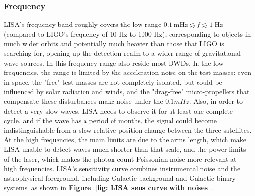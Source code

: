 \subsubsection{Frequency}
LISA's frequency band roughly covers the low range $0.1~\mathrm{mHz} \lesssim f \lesssim 1~\mathrm{Hz}$ (compared to LIGO's frequency of 10 Hz to 1000 Hz), corresponding to objects in much wider orbits and potentially much heavier than those that LIGO is searching for, opening up the detection realm to a wider range of gravitational wave sources. 
In this frequency range also reside most DWDs.  
In the low frequencies, the range is limited by the acceleration noise on the test masses: even in space, the "free" test masses are not completely isolated, but could be influenced by solar radiation and winds, and the "drag-free" micro-propellers that compensate these disturbances make noise under the $0.1mHz$. 
Also, in order to detect a very slow waves, LISA needs to observe it for at least one complete cycle, and if the wave has a period of months, the signal could become indistinguishable from a slow relative position change between the three satellites.
At the high frequencies, the main limits are due to the arms length, which make LISA unable to detect waves much shorter than that scale, and the power limits of the laser, which makes the photon count Poissonian noise more relevant at high frequencies.  
LISA’s sensitivity curve combines instrumental noise and the astrophysical foreground, including Galactic background and Galactic binary systems, as shown in \textbf{Figure~\ref{fig: LISA sens curve with noises}}. 
